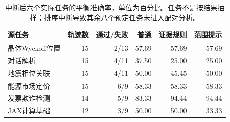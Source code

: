\begin{table}[t]
\caption{中断后六个实际任务的平衡准确率，单位为百分比。任务不是按结果抽样；排序中断导致其余八个预定任务未进入配对分析。}\label{tab:external-tasks}
\centering\small
\begin{tabularx}{\textwidth}{Xrrrrr}
\toprule
源任务 & 轨迹数 & 通过/失败 & 普通 & 证据规则 & 范围提示 \\
\midrule
晶体Wyckoff位置 & 15 & 2/13 & 57.69 & 57.69 & 57.69 \\
对话解析 & 15 & 4/11 & 37.50 & 25.00 & 25.00 \\
地震相位关联 & 15 & 4/11 & 50.00 & 45.45 & 50.00 \\
能源市场定价 & 15 & 6/9 & 58.33 & 58.33 & 58.33 \\
发票欺诈检测 & 14 & 5/9 & 83.33 & 94.44 & 94.44 \\
JAX计算基础 & 12 & 3/9 & 50.00 & 50.00 & 33.33 \\
\bottomrule
\end{tabularx}
\end{table}
